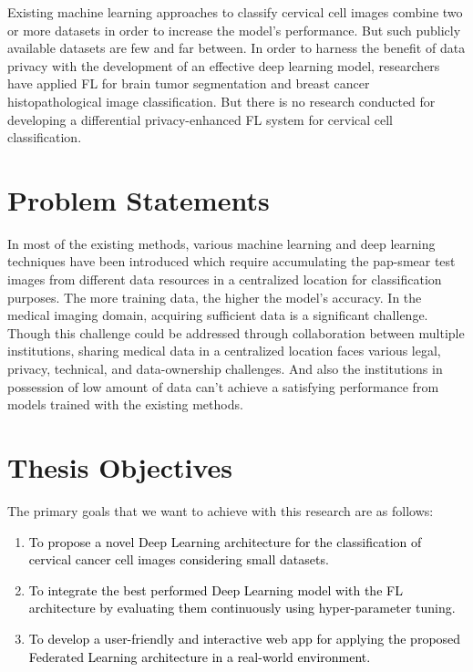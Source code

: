 Existing machine learning approaches to classify cervical cell images combine two or more datasets in order to increase the model's performance. 
But such publicly available datasets are few and far between. In order to harness the benefit of data privacy with the development of an effective deep learning model, researchers have applied FL for brain tumor segmentation and breast cancer histopathological image classification. But there is no research conducted for developing a differential privacy-enhanced FL system for cervical cell classification.

\section{Problem Statements}


In most of the existing methods, various machine learning and deep learning techniques have been introduced which require accumulating the pap-smear test images from different data resources in a centralized location for classification purposes. The more training data, the higher the model's accuracy. In the medical imaging domain, acquiring sufficient data is a significant challenge. Though this challenge could be addressed through collaboration between multiple institutions, sharing medical data in a centralized location faces various legal, privacy, technical, and data-ownership challenges. And also the institutions in possession of low amount of data can't achieve a satisfying performance from models trained with the existing methods.  


\clearpage
\section{Thesis Objectives}
\label{sec:objectives}
The primary goals that we want to achieve with this research are as follows: 
\begin{enumerate}
\item \textcolor{black}{To propose a novel Deep Learning architecture for the classification of cervical cancer cell images considering small datasets.}
\item \textcolor{black}{To integrate the best performed Deep Learning model with the FL architecture by evaluating them continuously using hyper-parameter tuning.}
\item \textcolor{black}{To develop a user-friendly and interactive web app for applying the proposed Federated Learning architecture in a real-world environment.}
\end{enumerate}
